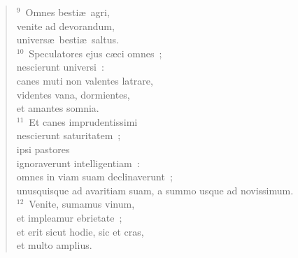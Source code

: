 \begin{flushleft}\begin{verse}${}^{9}$~Omnes besti\ae\ agri,\\ venite ad devorandum,\\ univers\ae\ besti\ae\ saltus.\\
${}^{10}$~Speculatores ejus c\ae ci omnes~;\\ nescierunt universi~:\\ canes muti non valentes latrare,\\ videntes vana, dormientes,\\ et amantes somnia.\\
${}^{11}$~Et canes imprudentissimi\\ nescierunt saturitatem~;\\ ipsi pastores\\ ignoraverunt intelligentiam~:\\ omnes in viam suam declinaverunt~;\\ unusquisque ad avaritiam suam, a summo usque ad novissimum.\\
${}^{12}$~Venite, sumamus vinum,\\ et impleamur ebrietate~;\\ et erit sicut hodie, sic et cras,\\ et multo amplius.\end{verse}\end{flushleft}


